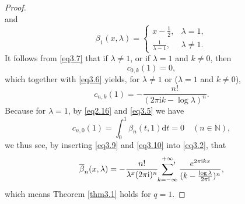 \documentclass[10pt,a4paper]{amsart}
\begin{document}
\begin{proof}
\begin{equation}
\end{equation}
and
\begin{equation}\label{eq3.8}
\beta_{1}(x,\lambda)=\begin{cases}
x-\frac{1}{2},  &\lambda=1,\\
\frac{1}{\lambda-1},  &\lambda\not=1.
\end{cases}
\end{equation}
It follows from \eqref{eq3.7} that if $\lambda\neq1$, or if $\lambda=1$ and $k\neq0$, then
\begin{equation*}
c_{0,k}(1)=0,
\end{equation*}
which together with \eqref{eq3.6} yields, for $\lambda\neq1$ or ($\lambda=1$ and $k\neq0$),
\begin{equation}\label{eq3.9}
c_{n,k}(1)=-\frac{n!}{(2\pi\mathrm{i}k-\log\lambda)^{n}}.
\end{equation}
Because for $\lambda=1$, by \eqref{eq2.16} and \eqref{eq3.5} we have
\begin{equation}\label{eq3.10}
c_{n,0}(1)=\int_{0}^{1}\beta_{n}(t,1)\text{d}t=0\quad(n\in\mathbb{N}),
\end{equation}
we thus see, by inserting \eqref{eq3.9} and \eqref{eq3.10} into \eqref{eq3.2}, that
\begin{equation}\label{eq3.11}
\overline{\beta}_{n}(x,\lambda)=-\frac{n!}{\lambda^{x}(2\pi \mathrm{i})^{n}}\sideset{}{'}\sum_{k=-\infty}^{+\infty}\frac{e^{2\pi\mathrm{i}kx}}{(k-\frac{\log\lambda}{2\pi\mathrm{i}})^{n}},
\end{equation}
which means Theorem \ref{thm3.1} holds for $q=1$.


\end{proof}
\end{document}
